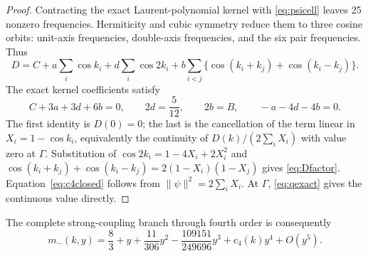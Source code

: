 \documentclass[11pt]{article}
\begin{document}
\begin{proof}
Contracting the exact Laurent-polynomial kernel with \eqref{eq:psicell}
leaves 25 nonzero frequencies. Hermiticity and cubic symmetry reduce them to
three cosine orbits: unit-axis frequencies, double-axis frequencies, and the
six pair frequencies. Thus
\[
D=C+a\sum_i\cos k_i+d\sum_i\cos2k_i
+b\sum_{i<j}\{\cos(k_i+k_j)+\cos(k_i-k_j)\}.
\]
The exact kernel coefficients satisfy
\[
C+3a+3d+6b=0,
\qquad 2d=\frac5{12},
\qquad 2b=B,
\qquad -a-4d-4b=0.
\]
The first identity is $D(0)=0$; the last is the cancellation of the term
linear in $X_i=1-\cos k_i$, equivalently the continuity of
$D(k)/(2\sum_iX_i)$ with value zero at $\Gamma$. Substitution of
$\cos2k_i=1-4X_i+2X_i^2$ and
$\cos(k_i+k_j)+\cos(k_i-k_j)=2(1-X_i)(1-X_j)$ gives
\eqref{eq:Dfactor}. Equation~\eqref{eq:c4closed} follows from
$\|\psi\|^2=2\sum_iX_i$. At $\Gamma$, \eqref{eq:qexact} gives the
continuous value directly.
\end{proof}

The complete strong-coupling branch through fourth order is consequently
\begin{equation}
m_-(k,y)=\frac83+y+\frac{11}{306}y^2
-\frac{109151}{249696}y^3+c_4(k)y^4+O(y^5).
\label{eq:branch4}
\end{equation}
\end{document}
